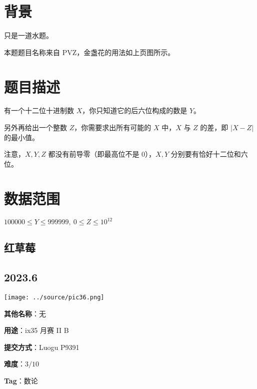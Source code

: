 \documentclass[a4paper,10pt]{article}
\begin{document}
\newpage

\section*{背景}

只是一道水题。

本题题目名称来自 PVZ，金盏花的用法如上页图所示。

\section*{题目描述}

有一个十二位十进制数 $X$，你只知道它的后六位构成的数是 $Y$。

另外再给出一个整数 $Z$，你需要求出所有可能的 $X$ 中，$X$ 与 $Z$ 的差，即 $|X-Z|$ 的最小值。

注意，$X,Y,Z$ 都没有前导零（即最高位不是 $0$），$X,Y$ 分别要有恰好十二位和六位。

\section*{数据范围}

$100000\leq Y\leq 999999,\ 0\leq Z\leq 10^{12}$

\newpage

\vspace*{\fill}
\begin{center}

\section{红草莓}

\subsection*{2023.6}

\vspace{10pt}

\texttt{[image: ../source/pic36.png]}

\vspace{10pt}

\textbf{其他名称}：无

\vspace{10pt}

\textbf{用途}：ix35 月赛 II B

\vspace{10pt}

\textbf{提交方式}：Luogu P9391

\vspace{10pt}

\textbf{难度}：$3/10$

\vspace{10pt}

\textbf{Tag}：数论

\end{center}
\vspace*{\fill}
\end{document}
